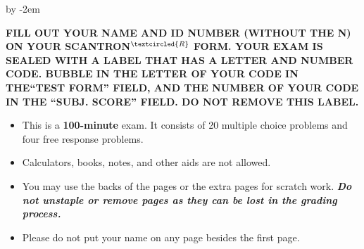 \documentclass{article}
\begin{document}
\textwidth%
\advance{} by -2em
\noindent{}
\bigskip

\noindent\textbf{\uppercase{Fill out your name and ID number (without the N) on your Scantron$^{\textcircled{\tiny R}}$ form.  Your exam is sealed with a label that has a letter and number code.  Bubble in the letter of your code in the``Test Form'' field, and the number of your code in the ``Subj. Score'' field.  Do not remove this label.}}


\begin{itemize}
\item This is a \textbf{100-minute} exam.  It consists of 20 multiple choice problems and four free response problems.
\item Calculators, books, notes, and other aids are not allowed.
\item You may use the backs of the pages or the extra pages for scratch work.  \textbf{\emph{Do not unstaple or remove pages as they can be lost in the grading process.}}
\item Please do not put your name on any page besides the first page.  
\end{itemize}

\end{document}
